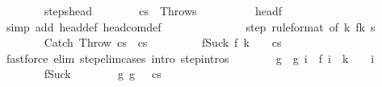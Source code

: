 \begin{isabellebody}
\ \ \ \ \ \ \isamarkupfalse%
\ steps{\isacharunderscore}head\isanewline
\ \ \ \ \ \ \isamarkupfalse%
\ {\isachardoublequoteopen}{\isasymGamma}{\isasymturnstile}{\isacharparenleft}cs{\isacharparenright}\ {\isasymrightarrow}\isactrlsup {\isacharasterisk}\ {\isacharparenleft}Throw{\isacharcomma}s{\isacharprime}{\isacharparenright}{\isachardoublequoteclose}\isanewline
\ \ \ \ \ \ \ \ \isamarkupfalse%
\ head{\isacharunderscore}f{\isacharunderscore}{}\isanewline
\ \ \ \ \ \ \ \ \isamarkupfalse%
\ {\isacharparenleft}simp\ add{\isacharcolon}\ head{\isacharunderscore}def\ head{\isacharunderscore}com{\isacharunderscore}def{\isacharparenright}\isanewline
\ \ \ \ \ \ \isamarkupfalse%
\isanewline
\ \ \ \ \ \ \isamarkupfalse%
\ step\ {\isacharbrackleft}rule{\isacharunderscore}format{\isacharcomma}\ of\ k{\isacharbrackright}\ f{\isacharunderscore}k\ s{\isacharprime}\isanewline
\ \ \ \ \ \ \isamarkupfalse%
\ {\isachardoublequoteopen}{\isasymGamma}{\isasymturnstile}{\isacharparenleft}Catch\ Throw\ cs{\isacharprime}{\isacharparenright}\ {\isasymrightarrow}\ {\isacharparenleft}cs{\isacharprime}{\isacharparenright}{\isachardoublequoteclose}\ \isanewline
\ \ \ \ \ \ \ \ f{\isacharunderscore}Suc{\isacharunderscore}k{\isacharcolon}\ {\isachardoublequoteopen}f\ {\isacharparenleft}k\ {\isacharplus}\ {}{\isacharparenright}\ {\isacharequal}\ {\isacharparenleft}cs{\isacharprime}{\isacharparenright}{\isachardoublequoteclose}\isanewline
\ \ \ \ \ \ \ \ \isamarkupfalse%
\ {\isacharparenleft}fastforce\ elim{\isacharcolon}\ step{\isacharunderscore}elim{\isacharunderscore}cases\ intro{\isacharcolon}\ step{\isachardot}intros{\isacharparenright}\isanewline
\ \ \ \ \ \ \isamarkupfalse%
\ g\ \ {\isachardoublequoteopen}g\ i\ {\isacharequal}\ f\ {\isacharparenleft}i\ {\isacharplus}\ {\isacharparenleft}k\ {\isacharplus}\ {}{\isacharparenright}{\isacharparenright}{\isachardoublequoteclose}\ \ i\isanewline
\ \ \ \ \ \ \isamarkupfalse%
\ f{\isacharunderscore}Suc{\isacharunderscore}k\isanewline
\ \ \ \ \ \ \isamarkupfalse%
\ g{\isacharunderscore}{}{\isacharcolon}\ {\isachardoublequoteopen}g\ {}\ {\isacharequal}\ {\isacharparenleft}cs{\isacharprime}{\isacharparenright}{\isachardoublequoteclose}\isanewline

\end{isabellebody}
